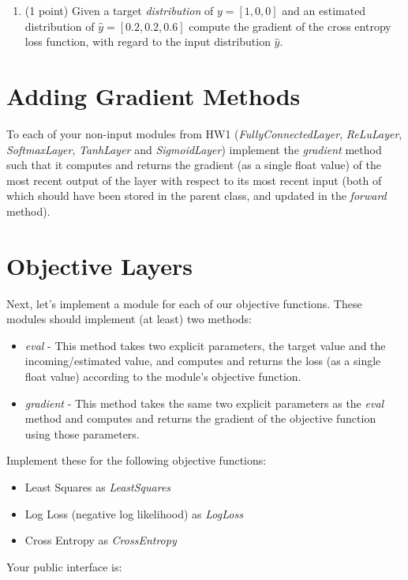\documentclass[12pt]{article}
\begin{document}
\begin{enumerate}
\item (1 point) Given a target \emph{distribution} of $y=[1, 0, 0]$ and an estimated distribution of $\hat{y}=[0.2, 0.2, 0.6]$ compute the gradient of the cross entropy loss function, with regard to the input distribution $\hat{y}$.

\end{enumerate}

\newpage
\section{Adding Gradient Methods}
To each of your non-input modules from HW1 (\emph{FullyConnectedLayer}, \emph{ReLuLayer}, \emph{SoftmaxLayer}, \emph{TanhLayer} and \emph{SigmoidLayer}) implement the \emph{gradient} method such that it computes and returns the gradient (as a single float value)  of the most recent output of the layer with respect to its most recent input (both of which should have been stored in the parent class, and updated in the \emph{forward} method).

\section{Objective Layers}
Next, let's implement a module for each of our objective functions.  These modules should implement (at least) two methods:
\begin{itemize}
\item \emph{eval} - This method takes two explicit parameters, the target value and the incoming/estimated value,  and computes and returns the loss (as a single float value) according to the module's objective function.
\item \emph{gradient} - This method takes the same two explicit parameters as the \emph{eval} method and computes and returns the gradient of the objective function using those parameters.
\end{itemize}

\noindent
Implement these for the following objective functions:
\begin{itemize}
\item Least Squares as \emph{LeastSquares}
\item Log Loss (negative log likelihood)  as \emph{LogLoss}
\item Cross Entropy as \emph{CrossEntropy}
\end{itemize}

\noindent
Your public interface is:
\end{document}

